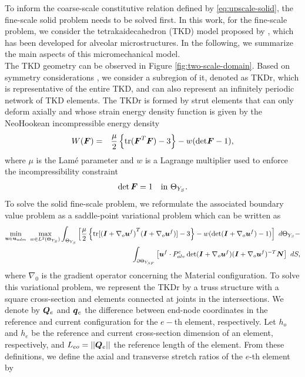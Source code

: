 \documentclass[preprint,3p,12pt,number,sort&compress]{elsarticle}
\def\vec   #1{\text{\boldmath $#1$}{}}
\def\ten   #1{\text{\boldmath $#1$}{}}
\DeclareMathOperator{\tr}{tr}
\begin{document}
To inform the coarse-scale constitutive relation defined by \eqref{eq:upscale-solid}, the fine-scale solid problem needs to be solved first. In this work, for the fine-scale problem, we consider the tetrakaidecahedron (TKD) model proposed by \citet{concha2020upscaling}, which has been developed for alveolar microstructures. In the following, we summarize the main aspects of this micromechanical model.\\  
The TKD geometry can be observed in Figure \ref{fig:two-scale-domain}. Based on symmetry considerations \cite{ConchaEtal2018}, we consider a subregion of it, denoted as TKDr, which is representative of the entire TKD, and can also represent an infinitely periodic network of TKD elements. The TKDr is formed by strut elements that can only deform axially and whose strain energy density function is given by the NeoHookean incompressible energy density
\begin{eqnarray}
	W(\ten F)  &=& \frac{\mu}{2}\left\{\mbox{tr}({\ten F}^T \ten F) - 3\right\} - w(\mbox{det} \ten F - 1),
	\label{eq:conslaw}
\end{eqnarray}
where $\mu$ is the Lam\'e parameter and $w$ is a Lagrange multiplier used to enforce the incompressibility constraint 
\begin{equation}
	\det \ten F = 1 \quad \text{in } \Theta_{Y_S}.
	\label{eq:incomp} 
\end{equation}
To solve the solid fine-scale problem, we reformulate the associated boundary value problem as a saddle-point variational problem which can be written as
\begin{align}
	\min \limits_{\substack{\vec u \in \vec u_{adm}}} \ 
	\max \limits_{w \in L^2(\Theta_{Y_S})}  
	\int_{\Theta_{Y_S}} \left[ 
	\frac{\mu}{2}\left\{ \tr[ {(\ten I + \nabla_o \vec u^f)}^T (\ten I + \nabla_o \vec u^f) ] -3 \right\}
	- w(\det (\ten I + \nabla_o \vec u^f) -1) \right] \ d\Theta_{Y_S}	 
	- \notag \\ 
	\int_{\partial \Theta_{Y_{SF}}} \left[ \vec u^f \cdot P_{alv}^c \det(\ten I + \nabla_o \vec u^f) (\ten I + \nabla_o \vec u^f)^{-T} \vec N  \right] \ dS,
	\label{eq:varprin}
\end{align}
where $\nabla_0$  is the gradient operator concerning the Material configuration. To solve this variational problem, we represent the TKDr by a truss structure with a square cross-section and elements connected at joints in the intersections. We denote by $\vec Q_e$ and $\vec q_e$ the difference between end-node coordinates in the reference and current configuration for the $e-$th element, respectively. Let $h_o$ and $h_e$ be the reference and current cross-section dimension of an element, respectively, and $L_{eo}=||\vec Q_e||$ the reference length of the element. From these definitions, we define the axial and transverse stretch ratios of the $e$-th element by
\end{document}
